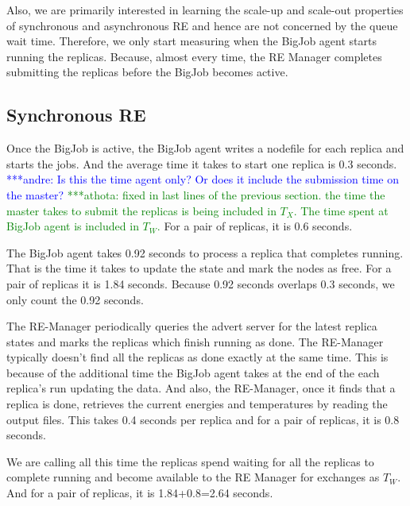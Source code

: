 \documentclass{rspublic}
\newcommand{\alnote}[1]{ {\textcolor{blue} { ***andre: #1 }}}
\newcommand{\athotanote}[1]{ {\textcolor{green} { ***athota: #1 }}}
\newcommand{\alnote}[1]{}
\newcommand{\athotanote}[1]{}
\begin{document}
Also, we are primarily
interested in learning the scale-up and scale-out properties of
synchronous and asynchronous RE and hence are not concerned by the
queue wait time. Therefore, we only start measuring when the BigJob agent starts running the replicas. Because, almost every time, the RE Manager completes submitting the replicas before the BigJob becomes active.

\subsection{Synchronous RE}
Once the BigJob is active, the BigJob agent writes a nodefile for each
replica and starts the jobs. And the average time it takes to start
one replica is 0.3 seconds.  \alnote{Is this the time agent only? Or
  does it include the submission time on the master?} \athotanote{fixed in last lines of the previous section. the time the master takes to submit the replicas is being included in $T_X$. The time spent at BigJob agent is included in $T_W$. }  For a pair of replicas, it is
0.6 seconds.

The BigJob agent takes 0.92 seconds to process a replica that completes running. That is the time it takes to update the state and
mark the nodes as free. For a pair of replicas it is 1.84 seconds. Because 0.92 seconds overlaps 0.3 seconds, we only count the 0.92 seconds. %

The RE-Manager periodically queries
the advert server for the latest replica states and marks the replicas
which finish running as done. The RE-Manager typically doesn't find
all the replicas as done exactly at the same time. This is because of the additional time the BigJob agent takes at the end of the each
replica's run updating the data. And also, the RE-Manager, once it
finds that a replica is done, retrieves the current energies and
temperatures by reading the output files. This takes 0.4 seconds per
replica and for a pair of replicas, it is 0.8 seconds. 

 We are calling all this time the replicas spend waiting for all the replicas to complete running and become available to the RE Manager for exchanges as $T_W$. And for a pair of replicas, it is 1.84+0.8=2.64 seconds.
\end{document}
